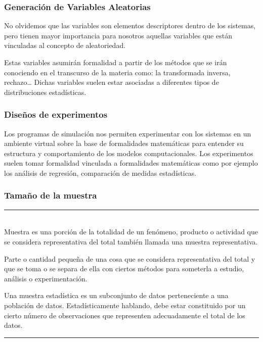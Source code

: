 \documentclass[11pt,letterpaper]{report}
\begin{document}
\subsubsection*{Generación de Variables Aleatorias}

No olvidemos que las variables son elementos descriptores dentro de los sistemas, pero tienen mayor importancia para nosotros aquellas variables que están vinculadas al concepto de aleatoriedad.

Estas variables asumirán formalidad a partir de los métodos que se irán conociendo en el transcurso de la materia como: la transformada inversa, rechazo\ldots{} Dichas variables suelen estar asociadas a diferentes tipos de distribuciones estadísticas.

\subsubsection*{Diseños de experimentos}

Los programas de simulación nos permiten experimentar con los sistemas en un ambiente virtual sobre la base de formalidades matemáticas para entender su estructura y comportamiento de los modelos computacionales. Los experimentos suelen tomar formalidad vinculada a formalidades matemáticas como por ejemplo los análisis de regresión, comparación de medidas estadísticas.

\subsubsection*{Tamaño de la muestra}

\begin{center}
\begin{minipage}{0.75\textwidth}
\centering\itshape
\rule{\textwidth}{0.4pt}\\[0.2cm]
Muestra es una porción de la totalidad de un fenómeno, producto o actividad que se considera representativa del total también llamada una muestra representativa.

\vspace{0.2cm}
Parte o cantidad pequeña de una cosa que se considera representativa del total y que se toma o se separa de ella con ciertos métodos para someterla a estudio, análisis o experimentación.

\vspace{0.2cm}
Una muestra estadística es un subconjunto de datos perteneciente a una población de datos. Estadísticamente hablando, debe estar constituido por un cierto número de observaciones que representen adecuadamente el total de los datos.\\[-0.1cm]
\rule{\textwidth}{0.4pt}
\end{minipage}
\end{center}
\end{document}
